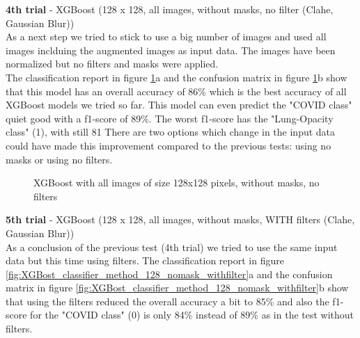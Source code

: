 \documentclass{article}
\begin{document}
\textbf{4th trial} - XGBoost (128 x 128, all images, without masks, no filter (Clahe, Gaussian Blur))\\
As a next step we tried to stick to use a big number of images and used all images inclduing the augmented images as input data. The images have been normalized but
no filters and masks were applied. \\
The classification report in figure \ref{fig:XGBost_classifier_method_128_nomask_nofilter}a and the confusion matrix in figure 
\ref{fig:XGBost_classifier_method_128_nomask_nofilter}b show that this model has an overall accuracy of 86\% which is the best accuracy of all XGBoost models we 
tried so far. This model can even predict the "COVID class" quiet good with a f1-score of 89\%. The worst f1-score has the "Lung-Opacity class" (1), with still 81%
There are two options which change in the input data could have made this improvement compared to the previous tests: using no masks or using no filters. 

\begin{figure}[!ht]
  \centering
  \qquad
  \caption{XGBoost with all images of size 128x128 pixels, without masks, no filters}
  \label{fig:XGBost_classifier_method_128_nomask_nofilter}
\end{figure}



\textbf{5th trial} - XGBoost (128 x 128, all images, without masks, WITH filters (Clahe, Gaussian Blur))\\
As a conclusion of the previous test (4th trial) we tried to use the same input data but this time using filters. The classification report in 
figure \ref{fig:XGBost_classifier_method_128_nomask_withfilter}a and the confusion matrix in figure \ref{fig:XGBost_classifier_method_128_nomask_withfilter}b show
that using the filters reduced the overall accuracy a bit to 85\% and also the f1-score for the "COVID class" (0) is only 84\% instead of 89\% as in the 
test without filters. 
\end{document}
